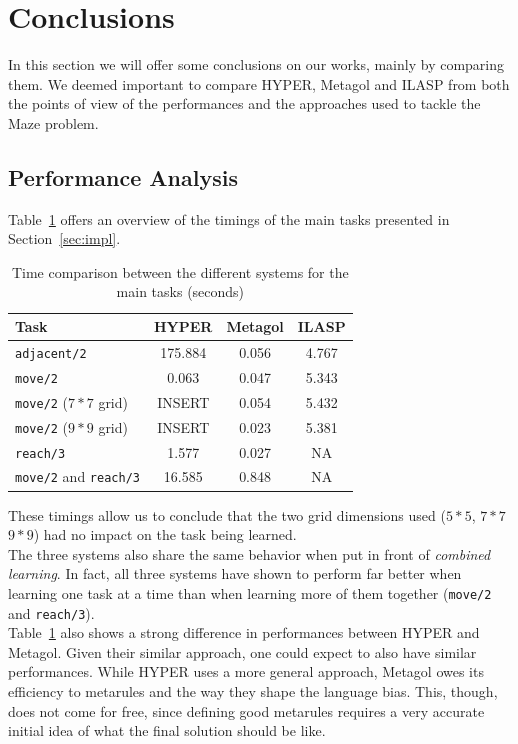 \section{Conclusions}\label{sec:perf}
In this section we will offer some conclusions on our works, mainly by comparing them. We deemed important
to compare HYPER, Metagol and ILASP from both the points of view of the performances and the approaches used
to tackle the Maze problem.

\subsection{Performance Analysis}
Table~\ref{tab:prf_cmp} offers an overview of the timings of the main tasks presented in Section~\ref{sec:impl}.
{
\begin{center}
    \begin{table}[h]
    \centering
    \begin{tabular}{ |l|c|c|c| } 
        \hline
        Task & \textbf{HYPER} & \textbf{Metagol} & \textbf{ILASP} \\ \hline
        \texttt{adjacent/2} & 175.884 & 0.056 & 4.767 \\ 
        \texttt{move/2} & 0.063 & 0.047 & 5.343 \\ 
        \texttt{move/2} (\(7*7\) grid) & INSERT & 0.054 & 5.432 \\
        \texttt{move/2} (\(9*9\) grid) & INSERT & 0.023 & 5.381 \\
        \texttt{reach/3} & 1.577 & 0.027 & NA \\ 
        \texttt{move/2} and \texttt{reach/3} & 16.585 & 0.848 & NA \\ 
        \hline
    \end{tabular}
    \caption{\label{tab:prf_cmp}Time comparison between the different systems for the main tasks (seconds)}
\end{table}
\end{center}
}
These timings allow us to conclude that the two grid dimensions used (\(5*5\), \(7*7\) \(9*9\)) had no impact on the task being learned.\\
The three systems also share the same behavior when put in front of \emph{combined learning}. In fact, all three systems have shown to perform 
far better when learning one task at a time than when learning more of them together (\texttt{move/2} and \texttt{reach/3}).\\
Table~\ref{tab:prf_cmp} also shows a strong difference in performances between HYPER and Metagol. Given their similar approach, one could expect
to also have similar performances. While HYPER uses a more general approach, Metagol owes its efficiency to metarules and the way they shape the language bias. This, though, does not come
for free, since defining good metarules requires a very accurate initial idea of what the final solution should be like.\\

